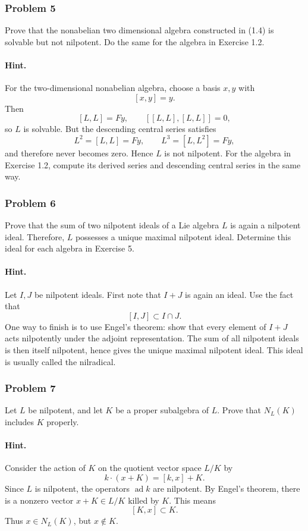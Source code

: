 \documentclass[12pt, a4paper]{article}
\begin{document}
\subsubsection{Problem 5}

Prove that the nonabelian two dimensional algebra constructed in (1.4) is
solvable but not nilpotent. Do the same for the algebra in Exercise 1.2.

\paragraph{Hint.}
For the two-dimensional nonabelian algebra, choose a basis \(x,y\) with
\[
[x,y]=y.
\]
Then
\[
[L,L]=Fy,
\qquad
[[L,L],[L,L]]=0,
\]
so \(L\) is solvable. But the descending central series satisfies
\[
L^2=[L,L]=Fy,\qquad L^3=[L,L^2]=Fy,
\]
and therefore never becomes zero. Hence \(L\) is not nilpotent. For the algebra
in Exercise 1.2, compute its derived series and descending central series in
the same way.

\subsubsection{Problem 6}

Prove that the sum of two nilpotent ideals of a Lie algebra \(L\) is again a
nilpotent ideal. Therefore, \(L\) possesses a unique maximal nilpotent ideal.
Determine this ideal for each algebra in Exercise 5.

\paragraph{Hint.}
Let \(I,J\) be nilpotent ideals. First note that \(I+J\) is again an ideal.
Use the fact that
\[
[I,J]\subset I\cap J.
\]
One way to finish is to use Engel's theorem: show that every element of
\(I+J\) acts nilpotently under the adjoint representation. The sum of all
nilpotent ideals is then itself nilpotent, hence gives the unique maximal
nilpotent ideal. This ideal is usually called the nilradical.

\subsubsection{Problem 7}

Let \(L\) be nilpotent, and let \(K\) be a proper subalgebra of \(L\). Prove
that \(N_L(K)\) includes \(K\) properly.

\paragraph{Hint.}
Consider the action of \(K\) on the quotient vector space \(L/K\) by
\[
k\cdot (x+K)=[k,x]+K.
\]
Since \(L\) is nilpotent, the operators \(\operatorname{ad}k\) are nilpotent.
By Engel's theorem, there is a nonzero vector \(x+K\in L/K\) killed by \(K\).
This means
\[
[K,x]\subset K.
\]
Thus \(x\in N_L(K)\), but \(x\notin K\).
\end{document}
